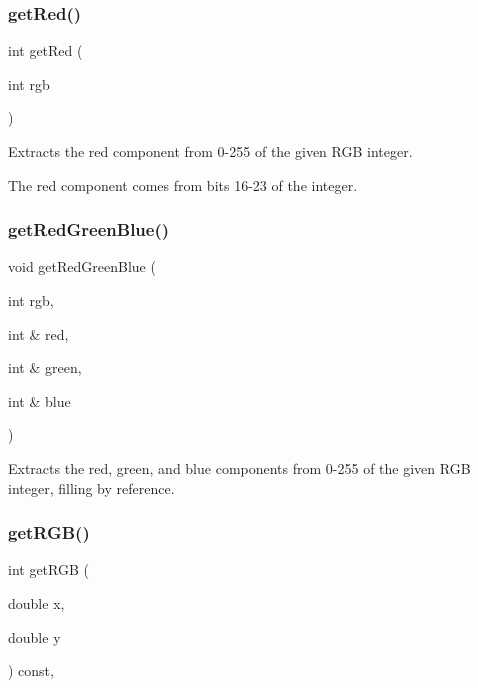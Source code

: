 \mbox{\label{classGCanvas_adef2eb72dada1f3c3ef5079705cd278a}} 
\subsubsection{\texorpdfstring{get\+Red()}{getRed()}}
{\footnotesize\ttfamily int get\+Red (\begin{DoxyParamCaption}\item[{int}]{rgb }\end{DoxyParamCaption})\hspace{0.3cm}{\ttfamily [static]}}



Extracts the red component from 0-\/255 of the given R\+GB integer. 

The red component comes from bits 16-\/23 of the integer. \mbox{\label{classGCanvas_ab13dd3d16d2b7bd90fbf9595df9cf2b7}} 
\subsubsection{\texorpdfstring{get\+Red\+Green\+Blue()}{getRedGreenBlue()}}
{\footnotesize\ttfamily void get\+Red\+Green\+Blue (\begin{DoxyParamCaption}\item[{int}]{rgb,  }\item[{int \&}]{red,  }\item[{int \&}]{green,  }\item[{int \&}]{blue }\end{DoxyParamCaption})\hspace{0.3cm}{\ttfamily [static]}}



Extracts the red, green, and blue components from 0-\/255 of the given R\+GB integer, filling by reference. 

\mbox{\label{classGDrawingSurface_a9e983467cf0c97cfd62433a8471570dc}} 
\subsubsection{\texorpdfstring{get\+R\+G\+B()}{getRGB()}}
{\footnotesize\ttfamily int get\+R\+GB (\begin{DoxyParamCaption}\item[{double}]{x,  }\item[{double}]{y }\end{DoxyParamCaption}) const\hspace{0.3cm}{\ttfamily [virtual]}, {\ttfamily [inherited]}}



